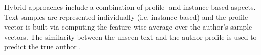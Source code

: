 Hybrid approaches include a combination of profile- and instance based aspects.
Text samples are represented individually (i.e. instance-based) and 
the profile vector is built via computing the feature-wise average over the author's sample vectors.
The similarity between the unseen text and the author profile is used to predict the true author \cite{stamatatos_survey_2009}.